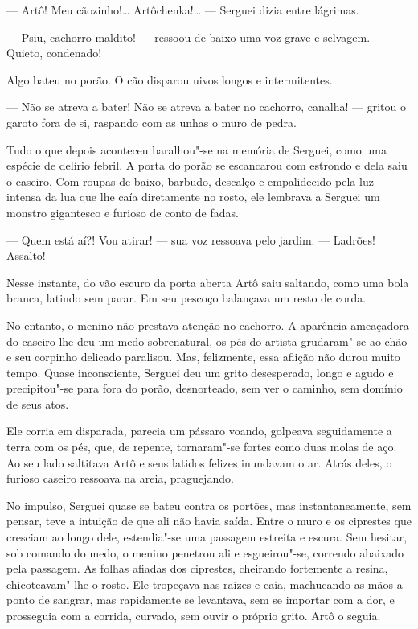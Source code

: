 --- Artô! Meu cãozinho!\ldots{} Artôchenka!\ldots{} --- Serguei dizia entre
lágrimas.

--- Psiu, cachorro maldito! --- ressoou de baixo uma voz grave e
selvagem. --- Quieto, condenado!

Algo bateu no porão. O cão disparou uivos longos e intermitentes.

--- Não se atreva a bater! Não se atreva a bater no cachorro, canalha!
--- gritou o garoto fora de si, raspando com as unhas o muro de pedra.

Tudo o que depois aconteceu baralhou"-se na memória de Serguei, como uma
espécie de delírio febril. A porta do porão se escancarou com estrondo e
dela saiu o caseiro. Com roupas de baixo, barbudo, descalço e
empalidecido pela luz intensa da lua que lhe caía diretamente no rosto,
ele lembrava a Serguei um monstro gigantesco e furioso de conto de
fadas.

--- Quem está aí?! Vou atirar! --- sua voz ressoava pelo jardim. ---
Ladrões! Assalto!

Nesse instante, do vão escuro da porta aberta Artô saiu saltando, como uma
bola branca, latindo sem parar. Em seu pescoço balançava um resto
de corda.

No entanto, o menino não prestava atenção no cachorro. A aparência
ameaçadora do caseiro lhe deu um medo sobrenatural, os pés do artista
grudaram"-se ao chão e seu corpinho delicado paralisou. Mas, felizmente,
essa aflição não durou muito tempo. Quase inconsciente, Serguei deu um
grito desesperado, longo e agudo e precipitou"-se para fora do porão,
desnorteado, sem ver o caminho, sem domínio de seus atos.

Ele corria em disparada, parecia um pássaro voando, golpeava
seguidamente a terra com os pés, que, de repente, tornaram"-se fortes
como duas molas de aço. Ao seu lado saltitava Artô e seus latidos
felizes inundavam o ar. Atrás deles, o furioso caseiro ressoava na
areia, praguejando.

No impulso, Serguei quase se bateu contra os portões, mas
instantaneamente, sem pensar, teve a intuição de que ali não havia
saída. Entre o muro e os ciprestes que cresciam ao longo dele,
estendia"-se uma passagem estreita e escura. Sem hesitar, sob comando do
medo, o menino penetrou ali e esgueirou"-se, correndo abaixado pela
passagem. As folhas afiadas dos ciprestes, cheirando fortemente a
resina, chicoteavam"-lhe o rosto. Ele tropeçava nas raízes e caía,
machucando as mãos a ponto de sangrar, mas rapidamente se levantava, sem
se importar com a dor, e prosseguia com a corrida, curvado, sem ouvir o
próprio grito. Artô o seguia.

